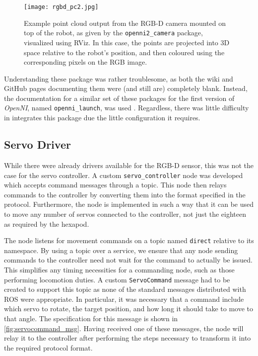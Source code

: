 \begin{figure}[!h]
    \centering
    \texttt{[image: rgbd\_pc2.jpg]}
    \caption{Example point cloud output from the RGB-D camera mounted on top of the robot, as given by the \texttt{openni2\_camera} package, visualized using RViz. In this case, the points are projected into 3D space relative to the robot's position, and then coloured using the corresponding pixels on the RGB image.}
    \label{fig:rgbd_images2}
\end{figure}

Understanding these package was rather troublesome, as both the wiki and GitHub pages documenting them were (and still are) completely blank. Instead, the documentation for a similar set of these packages for the first version of \emph{OpenNI}, named \texttt{openni\_launch}, was used \cite{ros_wiki_openni_launch}. Regardless, there was little difficulty in integrates this package due the little configuration it requires.

\subsection{Servo Driver}

While there were already drivers available for the RGB-D sensor, this was not the case for the servo controller. A custom \texttt{servo\_controller} node was developed which accepts command messages through a topic. This node then relays commands to the controller by converting them into the format specified in the protocol. Furthermore, the node is implemented in such a way that it can be used to move any number of servos connected to the controller, not just the eighteen as required by the hexapod.

The node listens for movement commands on a topic named \texttt{direct} relative to its namespace. By using a topic over a service, we ensure that any node sending commands to the controller need not wait for the command to actually be issued. This simplifies any timing necessities for a commanding node, such as those performing locomotion duties. A custom \texttt{ServoCommand} message had to be created to support this topic as none of the standard messages distributed with ROS were appropriate. In particular, it was necessary that a command include which servo to rotate, the target position, and how long it should take to move to that angle. The specification for this message is shown in \autoref{fig:servocommand_msg}. Having received one of these messages, the node will relay it to the controller after performing the steps necessary to transform it into the required protocol format.

